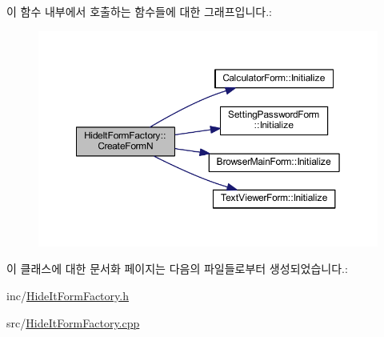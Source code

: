 이 함수 내부에서 호출하는 함수들에 대한 그래프입니다.\+:
\nopagebreak
\begin{figure}[H]
\begin{center}
\leavevmode
\includegraphics[width=350pt]{class_hide_it_form_factory_a6add8bfadf5e59c6d4221f85161640fb_cgraph}
\end{center}
\end{figure}




이 클래스에 대한 문서화 페이지는 다음의 파일들로부터 생성되었습니다.\+:\begin{DoxyCompactItemize}
\item 
inc/\hyperlink{_hide_it_form_factory_8h}{Hide\+It\+Form\+Factory.\+h}\item 
src/\hyperlink{_hide_it_form_factory_8cpp}{Hide\+It\+Form\+Factory.\+cpp}\end{DoxyCompactItemize}
